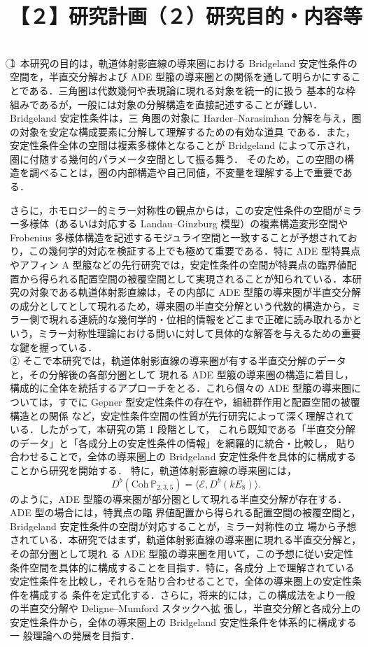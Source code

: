 \documentclass[11pt,a4paper]{ltjsarticle}
\newcommand{\研究課題名}{軌道体射影直線の導来圏の半直交分解とBridgeland安定性条件に関する研究}
\newcommand{\研究機関名}{大阪大学}
\newcommand{\研究代表者氏名}{山本 雄大}
\begin{document}
\section{【２】研究計画（２）研究目的・内容等}\\
\textcircled{1}\ 本研究の目的は，軌道体射影直線の導来圏における Bridgeland 安定性条件の空間を，半直交分解および ADE
型箙の導来圏との関係を通して明らかにすることである．三角圏は代数幾何や表現論に現れる対象を統一的に扱う
基本的な枠組みであるが，一般には対象の分解構造を直接記述することが難しい．Bridgeland 安定性条件は，三
角圏の対象に Harder–Narasimhan 分解を与え，圏の対象を安定な構成要素に分解して理解するための有効な道具
である．また，安定性条件全体の空間は複素多様体となることが Bridgeland によって示され，圏に付随する幾何的パラメータ空間として振る舞う．
そのため，この空間の構造を調べることは，圏の内部構造や自己同値，不変量を理解する上で重要である．

 さらに，ホモロジー的ミラー対称性の観点からは，この安定性条件の空間がミラー多様体（あるいは対応する Landau--Ginzburg 模型）の複素構造変形空間や Frobenius 多様体構造を記述するモジュライ空間と一致することが予想されており，この幾何学的対応を検証する上でも極めて重要である．特に ADE 型特異点やアフィン A 型箙などの先行研究では，安定性条件の空間が特異点の臨界値配置から得られる配置空間の被覆空間として実現されることが知られている．本研究の対象である軌道体射影直線は，その内部に ADE 型箙の導来圏が半直交分解の成分としてとして現れるため，導来圏の半直交分解という代数的構造から，ミラー側で現れる連続的な幾何学的・位相的情報をどこまで正確に読み取れるかという，ミラー対称性理論における問いに対して具体的な解答を与えるための重要な鍵を握っている．\vspace{0.5mm}\\

② そこで本研究では，軌道体射影直線の導来圏が有する半直交分解のデータと，その分解後の各部分圏として
現れる ADE 型箙の導来圏の構造に着目し，構成的に全体を統括するアプローチをとる．これら個々の ADE
型箙の導来圏については，すでに Gepner 型安定性条件の存在や，組紐群作用と配置空間の被覆構造との関係
など，安定性条件空間の性質が先行研究によって深く理解されている．したがって，本研究の第 1 段階として，
これら既知である「半直交分解のデータ」と「各成分上の安定性条件の情報」を網羅的に統合・比較し，
貼り合わせることで，全体の導来圏上の Bridgeland 安定性条件を具体的に構成することから研究を開始する．
特に，軌道体射影直線の導来圏には，
\[
D^b(\mathrm{Coh}\,\mathbb{P}_{2,3,5})
=
\langle \mathcal{E}, D^b(kE_8)\rangle .
\]
のように，ADE 型箙の導来圏が部分圏として現れる半直交分解が存在する．ADE 型の場合には，特異点の臨
界値配置から得られる配置空間の被覆空間と，Bridgeland 安定性条件の空間が対応することが，ミラー対称性の立
場から予想されている．本研究ではまず，軌道体射影直線の導来圏に現れる半直交分解と，その部分圏として現れ
る ADE 型箙の導来圏を用いて，この予想に従い安定性条件空間を具体的に構成することを目指す．特に，各成分
上で理解されている安定性条件を比較し，それらを貼り合わせることで，全体の導来圏上の安定性条件を構成する
条件を定式化する．さらに，将来的には，この構成法をより一般の半直交分解や Deligne–Mumford スタックへ拡
張し，半直交分解と各成分上の安定性条件から，全体の導来圏上の Bridgeland 安定性条件を体系的に構成する一
般理論への発展を目指す．
\end{document}
